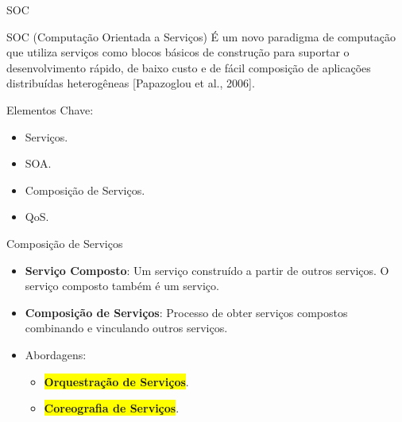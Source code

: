 \documentclass[xcolor=svgnames]{beamer}
\begin{document}
    \begin{frame}{SOC}
       	\begin{block}{SOC (Computação Orientada a Serviços)}\vspace{-.3\baselineskip}
           É um novo paradigma de computação que utiliza serviços como blocos básicos de construção
           para suportar o desenvolvimento rápido, de baixo custo e de fácil composição de aplicações
           distribuídas heterogêneas [Papazoglou et al., 2006]. %
        \end{block}
        Elementos Chave:

        \begin{itemize}
           \item Serviços.
           \item SOA.
           \item Composição de Serviços.
           \item QoS.
        \end{itemize}


        \tiny{
        }
        	
    \end{frame}


    \begin{frame}{Composição de Serviços}
        \begin{itemize}
          \item \textbf{Serviço Composto}: Um serviço construído a partir de outros serviços. O serviço composto também é um serviço.
          \item \textbf{Composição de Serviços}: Processo de  obter serviços compostos combinando e vinculando outros serviços.
          \item <1->Abordagens:
                \begin{itemize}
                  \item <2->\colorbox{yellow}{\textbf{Orquestração de Serviços}}.
                  \item <3->\colorbox{yellow}{\textbf{Coreografia de Serviços}}.
                \end{itemize}
        \end{itemize}
    \end{frame}
\end{document}
